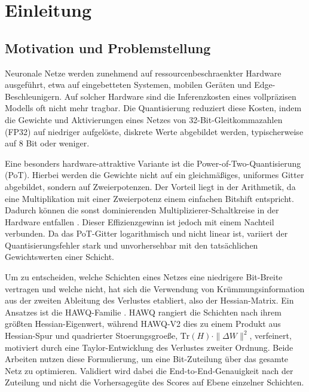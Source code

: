 \section{Einleitung}
\label{sec:introduction}

\subsection{Motivation und Problemstellung}

Neuronale Netze werden zunehmend auf ressourcenbeschraenkter Hardware ausgeführt, etwa auf eingebetteten Systemen, mobilen Geräten und Edge-Beschleunigern. Auf solcher Hardware sind die Inferenzkosten eines vollpräzisen Modells oft nicht mehr tragbar. Die Quantisierung reduziert diese Kosten, indem die Gewichte und Aktivierungen eines Netzes von 32-Bit-Gleitkommazahlen (FP32) auf niedriger aufgelöste, diskrete Werte abgebildet werden, typischerweise auf 8 Bit oder weniger. 
\par\medskip

Eine besonders hardware-attraktive Variante ist die Power-of-Two-Quantisierung (PoT). Hierbei werden die Gewichte nicht auf ein gleichmäßiges, uniformes Gitter abgebildet, sondern auf Zweierpotenzen. Der Vorteil liegt in der Arithmetik, da eine Multiplikation mit einer Zweierpotenz einem einfachen Bitshift entspricht. Dadurch können die sonst dominierenden Multiplizierer-Schaltkreise in der Hardware entfallen \citep{miyashita_pot_2016, przewlocka_rus_pot_2022}. Dieser Effizienzgewinn ist jedoch mit einem Nachteil verbunden. Da das PoT-Gitter logarithmisch und nicht linear ist, variiert der Quantisierungsfehler stark und unvorhersehbar mit den tatsächlichen Gewichtswerten einer Schicht. 
\par\medskip

Um zu entscheiden, welche Schichten eines Netzes eine niedrigere Bit-Breite vertragen und welche nicht, hat sich die Verwendung von Krümmungsinformation aus der zweiten Ableitung des Verlustes etabliert, also der Hessian-Matrix. Ein Ansatzes ist die HAWQ-Familie \citep{dong_hawq_2019, dong_hawqv2_2020}. HAWQ rangiert die Schichten nach ihrem größten Hessian-Eigenwert, während HAWQ-V2 dies zu einem Produkt aus Hessian-Spur und quadrierter Stoerungsgroeße, $\mathrm{Tr}(H)\cdot\|\Delta W\|^2$, verfeinert, motiviert durch eine Taylor-Entwicklung des Verlustes zweiter Ordnung. Beide Arbeiten nutzen diese Formulierung, um eine Bit-Zuteilung über das gesamte Netz zu optimieren. Validiert wird dabei die End-to-End-Genauigkeit nach der Zuteilung und nicht die Vorhersagegüte des Scores auf Ebene einzelner Schichten.
\par\medskip

